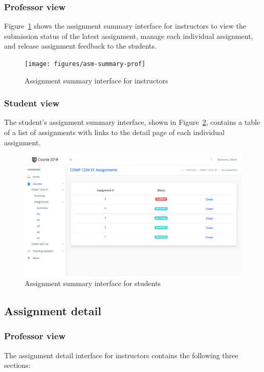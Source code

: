 \subsubsection{Professor view}
Figure~\ref{fig:ASM_SUMMARY_PROF} shows the assignment summary interface for
instructors to view the submission status of the latest assignment, manage
each individual assignment, and release assignment feedback to the students.

\begin{figure}[ht]
    \centering
        \texttt{[image: figures/asm-summary-prof]}
    \caption{Assignment summary interface for instructors}
    \label{fig:ASM_SUMMARY_PROF}
\end{figure}

\subsubsection{Student view}
The student's assignment summary interface, shown in
Figure~\ref{fig:ASM_SUMMARY_STUDENT}, contains a table of a list
of assignments with links to the detail page of each individual assignment.

\begin{figure}[ht]
    \centering
        \includegraphics[width=1.0\textwidth]{figures/asm-summary-student}
    \caption{Assignment summary interface for students}
    \label{fig:ASM_SUMMARY_STUDENT}
\end{figure}

\subsection{Assignment detail}

\subsubsection{Professor view}
The assignment detail interface for instructors contains the following three
sections:

